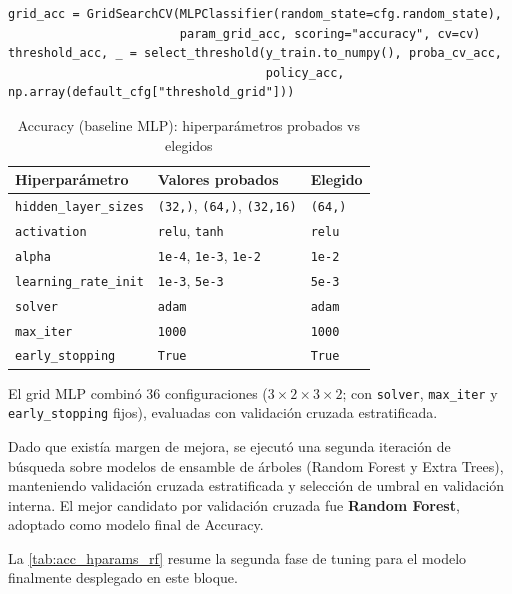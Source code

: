 \begin{lstlisting}[caption={Búsqueda compacta en Accuracy},label={lst:accuracy_search}]
grid_acc = GridSearchCV(MLPClassifier(random_state=cfg.random_state),
						param_grid_acc, scoring="accuracy", cv=cv)
threshold_acc, _ = select_threshold(y_train.to_numpy(), proba_cv_acc,
									policy_acc, np.array(default_cfg["threshold_grid"]))
\end{lstlisting}

\begin{table}[h]
\centering
\small
\caption{Accuracy (baseline MLP): hiperparámetros probados vs elegidos}
\label{tab:acc_hparams_mlp}
\begin{tabular}{p{}p{}p{}}
\toprule
\textbf{Hiperparámetro} & \textbf{Valores probados} & \textbf{Elegido} \\
\midrule
\texttt{hidden\_layer\_sizes} & \texttt{(32,)}, \texttt{(64,)}, \texttt{(32,16)} & \texttt{(64,)} \\
\texttt{activation} & \texttt{relu}, \texttt{tanh} & \texttt{relu} \\
\texttt{alpha} & \texttt{1e-4}, \texttt{1e-3}, \texttt{1e-2} & \texttt{1e-2} \\
\texttt{learning\_rate\_init} & \texttt{1e-3}, \texttt{5e-3} & \texttt{5e-3} \\
\texttt{solver} & \texttt{adam} & \texttt{adam} \\
\texttt{max\_iter} & \texttt{1000} & \texttt{1000} \\
\texttt{early\_stopping} & \texttt{True} & \texttt{True} \\
\bottomrule
\end{tabular}
\end{table}

El grid MLP combinó 36 configuraciones ($3\times2\times3\times2$; con \texttt{solver}, \texttt{max\_iter} y \texttt{early\_stopping} fijos), evaluadas con validación cruzada estratificada.

Dado que existía margen de mejora, se ejecutó una segunda iteración de búsqueda sobre modelos de ensamble de árboles (Random Forest y Extra Trees), manteniendo validación cruzada estratificada y selección de umbral en validación interna. El mejor candidato por validación cruzada fue \textbf{Random Forest}, adoptado como modelo final de Accuracy.

La \cref{tab:acc_hparams_rf} resume la segunda fase de tuning para el modelo finalmente desplegado en este bloque.

